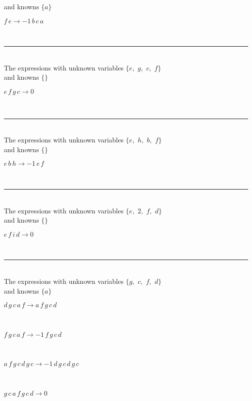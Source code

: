 and knowns $\{a\}$\smallskip\\
\begin{minipage}{6in}
$
f\,
 e\rightarrow -1\,
 b\,
 c\,
 a
$
\end{minipage}\\
\rule[3pt]{6in}{.7pt}\\
The expressions with unknown variables $\{e,
$ $
g,
$ $
c,
$ $
f\}$\\
and knowns $\{\}$\smallskip\\
\begin{minipage}{6in}
$
e\,
 f\,
 g\,
 c\rightarrow 0
$
\end{minipage}\\
\rule[3pt]{6in}{.7pt}\\
The expressions with unknown variables $\{e,
$ $
h,
$ $
b,
$ $
f\}$\\
and knowns $\{\}$\smallskip\\
\begin{minipage}{6in}
$
e\,
 b\,
 h\rightarrow -1\,
 e\,
 f
$
\end{minipage}\\
\rule[3pt]{6in}{.7pt}\\
The expressions with unknown variables $\{e,
$ $
2,
$ $
f,
$ $
d\}$\\
and knowns $\{\}$\smallskip\\
\begin{minipage}{6in}
$
e\,
 f\,
 i\,
 d\rightarrow 0
$
\end{minipage}\\
\rule[3pt]{6in}{.7pt}\\
The expressions with unknown variables $\{g,
$ $
c,
$ $
f,
$ $
d\}$\\
and knowns $\{a\}$\smallskip\\
\begin{minipage}{6in}
$
d\,
 g\,
 c\,
 a\,
 f\rightarrow a\,
 f\,
 g\,
 c\,
 d
$
\end{minipage}\medskip \\
\begin{minipage}{6in}
$
f\,
 g\,
 c\,
 a\,
 f\rightarrow -1\,
 f\,
 g\,
 c\,
 d
$
\end{minipage}\medskip \\
\begin{minipage}{6in}
$
a\,
 f\,
 g\,
 c\,
 d\,
 g\,
 c\rightarrow -1\,
 d\,
 g\,
 c\,
 d\,
 g\,
 c
$
\end{minipage}\medskip \\
\begin{minipage}{6in}
$
g\,
 c\,
 a\,
 f\,
 g\,
 c\,
 d\rightarrow 0
$
\end{minipage}\\
